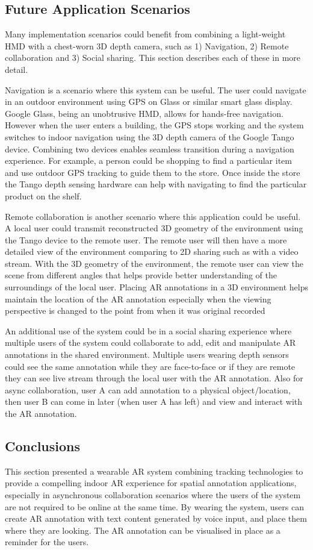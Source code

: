\subsection{Future Application Scenarios}

Many implementation scenarios could benefit from combining a light-weight HMD with a chest-worn 3D depth camera, such as 1) Navigation, 2) Remote collaboration and 3) Social sharing. This section describes each of these in more detail.

Navigation is a scenario where this system can be useful. The user could navigate in an outdoor environment using GPS on Glass or similar smart glass display. Google Glass, being an unobtrusive HMD, allows for hands-free navigation. However when the user enters a building, the GPS stops working and the system switches to indoor navigation using the 3D depth camera of the Google Tango device. Combining two devices enables seamless transition during a navigation experience. For example, a person could be shopping to find a particular item and use outdoor GPS tracking to guide them to the store. Once inside the store the Tango depth sensing hardware can help with navigating to find the particular product on the shelf.

Remote collaboration is another scenario where this application could be useful. A local user could transmit reconstructed 3D geometry of the environment using the Tango device to the remote user. The remote user will then have a more detailed view of the environment comparing to 2D sharing such as with a video stream. With the 3D geometry of the environment, the remote user can view the scene from different angles that helps provide better understanding of the surroundings of the local user. Placing AR annotations in a 3D environment helps maintain the location of the AR annotation especially when the viewing perspective is changed to the point from when it was original recorded

An additional use of the system could be in a social sharing experience where multiple users of the system could collaborate to add, edit and manipulate AR annotations in the shared environment. Multiple users wearing depth sensors could see the same annotation while they are face-to-face or if they are remote they can see live stream through the local user with the AR annotation. Also for async collaboration, user A can add annotation to a physical object/location, then user B can come in later (when user A has left) and view and interact with the AR annotation.

\subsection{Conclusions}

This section presented a wearable AR system combining tracking technologies to provide a compelling indoor AR experience for spatial annotation applications, especially in asynchronous collaboration scenarios where the users of the system are not required to be online at the same time. By wearing the system, users can create AR annotation with text content generated by voice input, and place them where they are looking. The AR annotation can be visualised in place as a reminder for the users.  
